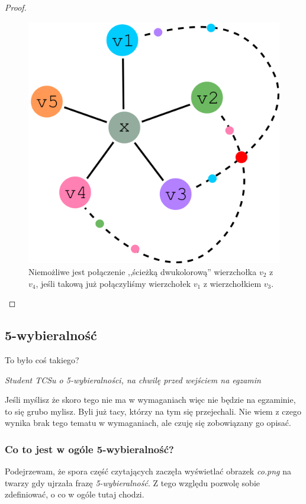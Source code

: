 \begin{proof}
	\begin{figure}[H]
		\centering
		\includegraphics[scale=0.5]{images/graf_planarny.png}
		\caption{Niemożliwe jest połączenie ,,ścieżką dwukolorową'' wierzchołka $v_2$ z $v_4$, jeśli takową już połączyliśmy wierzchołek $v_1$ z wierzchołkiem $v_3$.}
	\end{figure}

\end{proof}

\subsection{5-wybieralność}
\epigraph{To było coś takiego?}{\textit{Student TCSu o 5-wybieralności, na chwilę przed wejściem na egzamin}}
Jeśli myślisz że skoro tego nie ma w wymaganiach więc nie będzie na egzaminie, to się grubo mylisz. Byli już tacy, którzy na tym się przejechali. Nie wiem z czego wynika brak tego tematu w wymaganiach, ale czuję się zobowiązany go opisać.

\subsubsection{Co to jest w ogóle 5-wybieralność?}
Podejrzewam, że spora część czytających zaczęła wyświetlać obrazek \textit{co.png} na twarzy gdy ujrzała frazę \textit{5-wybieralność}. Z tego względu pozwolę sobie zdefiniować, o co w ogóle tutaj chodzi.

